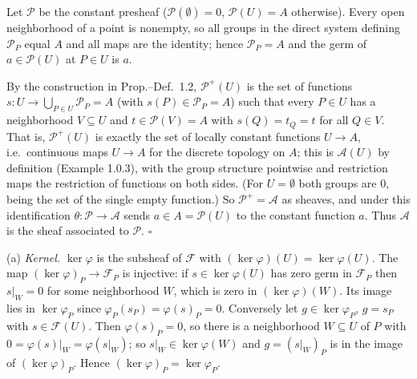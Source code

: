 \documentclass[11pt]{article}
\begin{document}
\pf
Let $\mathcal P$ be the constant presheaf ($\mathcal P(\emptyset)=0$, $\mathcal P(U)=A$ otherwise). Every open neighborhood of a point is nonempty, so all groups in the direct system defining $\mathcal P_P$ equal $A$ and all maps are the identity; hence $\mathcal P_P=A$ and the germ of $a\in\mathcal P(U)$ at $P\in U$ is $a$.

By the construction in Prop.--Def.~1.2, $\mathcal P^+(U)$ is the set of functions $s\colon U\to\bigcup_{P\in U}\mathcal P_P=A$ (with $s(P)\in\mathcal P_P=A$) such that every $P\in U$ has a neighborhood $V\subseteq U$ and $t\in\mathcal P(V)=A$ with $s(Q)=t_Q=t$ for all $Q\in V$. That is, $\mathcal P^+(U)$ is exactly the set of locally constant functions $U\to A$, i.e.\ continuous maps $U\to A$ for the discrete topology on $A$; this is $\mathcal A(U)$ by definition (Example 1.0.3), with the group structure pointwise and restriction maps the restriction of functions on both sides. (For $U=\emptyset$ both groups are $0$, being the set of the single empty function.) So $\mathcal P^+=\mathcal A$ as sheaves, and under this identification $\theta\colon \mathcal P\to\mathcal A$ sends $a\in A=\mathcal P(U)$ to the constant function $a$. Thus $\mathcal A$ is the sheaf associated to $\mathcal P$.
\hfill$\square$

\pf
(a) \emph{Kernel.} $\ker\varphi$ is the subsheaf of $\mathcal F$ with $(\ker\varphi)(U)=\ker\varphi(U)$. The map $(\ker\varphi)_P\to\mathcal F_P$ is injective: if $s\in\ker\varphi(U)$ has zero germ in $\mathcal F_P$ then $s|_W=0$ for some neighborhood $W$, which is zero in $(\ker\varphi)(W)$. Its image lies in $\ker\varphi_P$ since $\varphi_P(s_P)=\varphi(s)_P=0$. Conversely let $g\in\ker\varphi_P$, $g=s_P$ with $s\in\mathcal F(U)$. Then $\varphi(s)_P=0$, so there is a neighborhood $W\subseteq U$ of $P$ with $0=\varphi(s)|_W=\varphi(s|_W)$; so $s|_W\in\ker\varphi(W)$ and $g=(s|_W)_P$ is in the image of $(\ker\varphi)_P$. Hence $(\ker\varphi)_P=\ker\varphi_P$.
\end{document}
